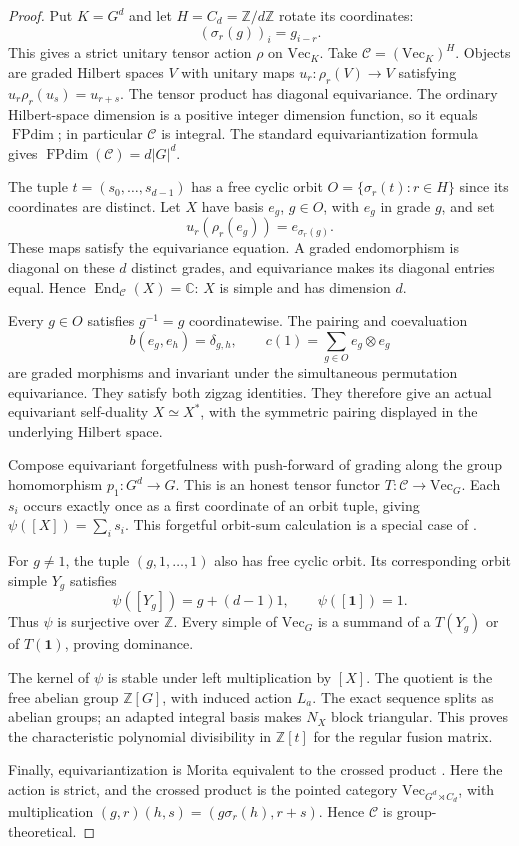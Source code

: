 \documentclass[11pt]{amsart}
\theoremstyle{remark}
\newcommand{\VEC}{\mathrm{Vec}}
\newcommand{\FPdim}{\operatorname{FPdim}}
\newcommand{\Z}{\mathbb Z}
\newcommand{\C}{\mathbb C}
\begin{document}
\begin{proof}
Put $K=G^d$ and let $H=C_d=\Z/d\Z$ rotate its coordinates:
\[
 (\sigma_r(g))_i=g_{i-r}.
\]
This gives a strict unitary tensor action $\rho$ on $\VEC_K$. Take
$\mathcal C=(\VEC_K)^H$. Objects are graded Hilbert spaces $V$ with
unitary maps $u_r:\rho_r(V)\to V$ satisfying
$u_r\rho_r(u_s)=u_{r+s}$. The tensor product has diagonal equivariance.
The ordinary Hilbert-space dimension is a positive integer dimension
function, so it equals $\FPdim$; in particular $\mathcal C$ is integral.
The standard equivariantization formula gives $\FPdim(\mathcal C)=d|G|^d$.

The tuple $t=(s_0,\ldots,s_{d-1})$ has a free cyclic orbit
$O=\{\sigma_r(t):r\in H\}$ since its coordinates are distinct.
Let $X$ have basis $e_g$, $g\in O$, with $e_g$ in grade $g$, and set
\[
 u_r(\rho_r(e_g))=e_{\sigma_r(g)}.
\]
These maps satisfy the equivariance equation. A graded endomorphism is
diagonal on these $d$ distinct grades, and equivariance makes its
diagonal entries equal. Hence $\operatorname{End}_{\mathcal C}(X)=\C$:
$X$ is simple and has dimension $d$.

Every $g\in O$ satisfies $g^{-1}=g$ coordinatewise. The pairing and
coevaluation
\[
 b(e_g,e_h)=\delta_{g,h},\qquad
 c(1)=\sum_{g\in O}e_g\otimes e_g
\]
are graded morphisms and invariant under the simultaneous permutation
equivariance. They satisfy both zigzag identities. They therefore give
an actual equivariant self-duality $X\simeq X^*$, with the symmetric
pairing displayed in the underlying Hilbert space.

Compose equivariant forgetfulness with push-forward of grading along
the group homomorphism $p_1:G^d\to G$. This is an honest tensor functor
$T:\mathcal C\to\VEC_G$. Each $s_i$ occurs exactly once as a first
coordinate of an orbit tuple, giving $\psi([X])=\sum_i s_i$. This
forgetful orbit-sum calculation is a special case of
\cite[proof of Theorem 4.8]{Witherspoon}.

For $g\ne1$, the tuple $(g,1,\ldots,1)$ also has free cyclic orbit.
Its corresponding orbit simple $Y_g$ satisfies
\[
 \psi([Y_g])=g+(d-1)1,\qquad \psi([\mathbf1])=1.
\]
Thus $\psi$ is surjective over $\Z$. Every simple of $\VEC_G$ is a
summand of a $T(Y_g)$ or of $T(\mathbf1)$, proving dominance.

The kernel of $\psi$ is stable under left multiplication by $[X]$.
The quotient is the free abelian group $\Z[G]$, with induced action
$L_a$. The exact sequence splits as abelian groups; an adapted integral
basis makes $N_X$ block triangular. This proves the characteristic
polynomial divisibility in $\Z[t]$ for the regular fusion matrix.

Finally, equivariantization is Morita equivalent to the crossed product
\cite[Example 7.5 and Remark 7.6]{MN}. Here the action is strict, and the
crossed product is the pointed category
$\VEC_{G^d\rtimes C_d}$, with multiplication
$(g,r)(h,s)=(g\sigma_r(h),r+s)$. Hence $\mathcal C$ is group-theoretical.
\end{proof}
\end{document}
